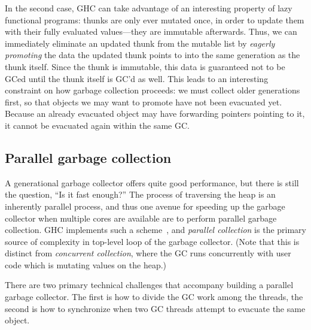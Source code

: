 In the second case, GHC can take advantage of an interesting property of
lazy functional programs: thunks are only ever mutated once, in order to
update them with their fully evaluated values---they are immutable
afterwards.  Thus, we can immediately eliminate an updated thunk from
the mutable list by \emph{eagerly promoting} the data the updated thunk
points to into the same generation as the thunk itself.  Since the thunk
is immutable, this data is guaranteed not to be GCed until the thunk
itself is GC'd as well.  This leads to an interesting constraint on how
garbage collection proceeds: we must collect older generations first, so
that objects we may want to promote have not been evacuated yet.
Because an already evacuated object may have forwarding pointers
pointing to it, it cannot be evacuated again within the same GC.


\subsection{Parallel garbage collection}

A generational garbage collector offers quite good performance, but
there is still the question, ``Is it fast enough?''  The process of
traversing the heap is an inherently parallel process, and thus one
avenue for speeding up the garbage collector when multiple cores are
available are to perform parallel garbage collection.  GHC implements
such a scheme~\cite{Marlow:2008:PGG:1375634.1375637}, and \emph{parallel collection} is the primary source of
complexity in top-level loop of the garbage collector.  (Note that this
is distinct from \emph{concurrent collection}, where the GC runs concurrently
with user code which is mutating values on the heap.)

There are two primary technical challenges that accompany building a
parallel garbage collector.  The first is how to divide the GC work
among the threads, the second is how to synchronize when two GC threads
attempt to evacuate the same object.

